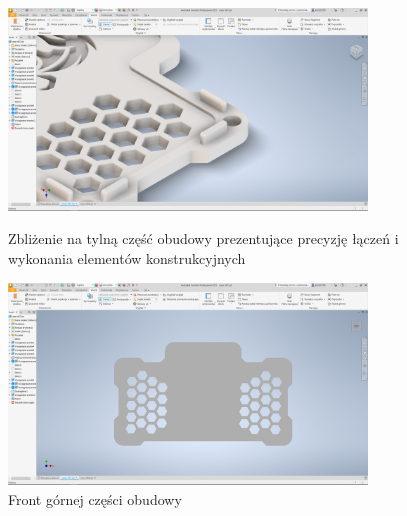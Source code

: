\clearpage
\begin{figure}[htbp]
\centering
	\includegraphics[width=0.85\textwidth]{root/cover_top_closeup_back.png}
	\caption{Zbliżenie na tylną część obudowy prezentujące precyzję łączeń i wykonania elementów konstrukcyjnych}
	\vspace{1cm}
	\includegraphics[width=0.85\textwidth]{root/cover_top_front.png}
	\caption{Front górnej części obudowy}
\end{figure}

